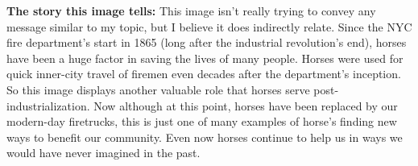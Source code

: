 

\textbf{The story this image tells:} This image isn't really trying to convey any message similar to my topic, but I believe it does indirectly relate.  Since the NYC fire department's start in 1865 (long after the industrial revolution's end), horses have been a huge factor in saving the lives of many people.  Horses were used for quick inner-city travel of firemen even decades after the department's inception.  So this image displays another valuable role that horses serve post-industrialization.  Now although at this point, horses have been replaced by our modern-day firetrucks, this is just one of many examples of horse's finding new ways to benefit our community.  Even now horses continue to help us in ways we would have never imagined in the past.